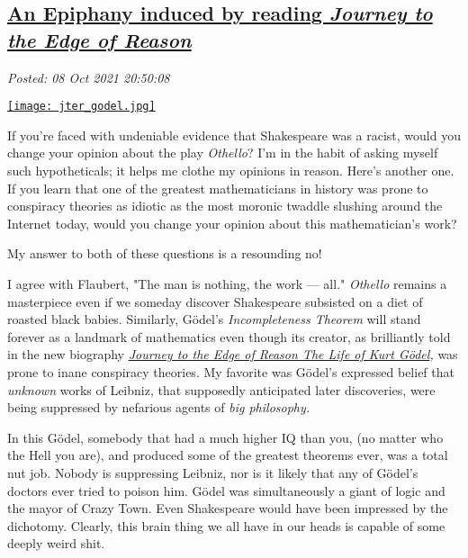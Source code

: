 %

\subsection*{\href{http://analyzethedatanotthedrivel.org/2021/10/08/an-epiphany-induced-by-reading-journey-to-the-edge-of-reason/}{An Epiphany induced by reading \emph{Journey to the Edge of Reason}}}


\noindent\emph{Posted: 08 Oct 2021 20:50:08}
\vspace{6pt}

\captionsetup[floatingfigure]{labelformat=empty}
\begin{floatingfigure}[r]{0.23\textwidth}
\centering
\href{https://www.goodreads.com/book/show/55298400-journey-to-the-edge-of-reason}{\texttt{[image: jter\_godel.jpg]}}
\caption[Journey to the Edge of Reason The Life of Kurt Gödel]{}
\label{fig:7238x0}
\end{floatingfigure}
If you're faced with undeniable evidence that Shakespeare was a racist,
would you change your opinion about the play \emph{Othello}? I'm in the
habit of asking myself such hypotheticals; it helps me clothe my
opinions in reason. Here's another one. If you learn that one of the
greatest mathematicians in history was prone to conspiracy theories as
idiotic as the most moronic twaddle slushing around the Internet today,
would you change your opinion about this mathematician's work?

My answer to both of these questions is a resounding no!

I agree with Flaubert, "The man is nothing, the work --- all."
\emph{Othello} remains a masterpiece even if we someday discover
Shakespeare subsisted on a diet of roasted black babies. Similarly,
Gödel's \emph{Incompleteness Theorem} will stand forever as a landmark
of mathematics even though its creator, as brilliantly told in the new
biography
\href{https://www.goodreads.com/book/show/55298400-journey-to-the-edge-of-reason}{\emph{Journey
to the Edge of Reason The Life of Kurt Gödel}}\emph{,} was prone to
inane conspiracy theories. My favorite was Gödel's expressed belief that
\emph{unknown} works of Leibniz, that supposedly anticipated
later discoveries, were being suppressed by nefarious agents of
\emph{big philosophy.}

In this Gödel, somebody that had a much higher IQ than you, (no matter
who the Hell you are), and produced some of the greatest theorems ever,
was a total nut job. Nobody is suppressing Leibniz, nor is it likely
that any of Gödel's doctors ever tried to poison him. Gödel was
simultaneously a giant of logic and the mayor of Crazy Town. Even
Shakespeare would have been impressed by the dichotomy. Clearly, this
brain thing we all have in our heads is capable of some deeply weird
shit.

